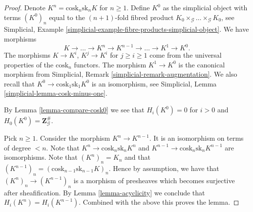 \documentclass[10pt,a4paper]{amsart}
\theoremstyle{plain}
\theoremstyle{definition}
\theoremstyle{remark}
\numberwithin{equation}{subsection}
\begin{document}
\begin{proof}
Denote $K^n = \text{cosk}_n \text{sk}_n K$ for $n \geq 1$.
Define $K^0$ as the simplicial object with terms
$(K^0)_n$ equal to the $(n + 1)$-fold fibred product
$K_0 \times_\mathcal{G} \ldots \times_\mathcal{G} K_0$,
see Simplicial,
Example \ref{simplicial-example-fibre-products-simplicial-object}.
We have morphisms
$$
K \longrightarrow \ldots \to K^n \to K^{n - 1} \to \ldots \to K^1 \to K^0.
$$
The morphisms $K \to K^i$, $K^j \to K^i$ for $j \geq i \geq 1$ come
from the universal properties of the $\text{cosk}_n$ functors.
The morphism $K^1 \to K^0$ is the canonical morphism
from
Simplicial, Remark \ref{simplicial-remark-augmentation}.
We also recall that $K^0 \to \text{cosk}_1 \text{sk}_1 K^0$
is an isomorphism, see
Simplicial, Lemma \ref{simplicial-lemma-cosk-minus-one}.

\medskip\noindent
By Lemma \ref{lemma-compare-cosk0} we see that
$H_i(K^0) = 0$ for $i > 0$ and $H_0(K^0) = \mathbf{Z}_\mathcal{G}^\#$.

\medskip\noindent
Pick $n \geq 1$. Consider the morphism $K^n \to K^{n - 1}$.
It is an isomorphism on terms of degree $< n$.
Note that $K^n \to \text{cosk}_n \text{sk}_n K^n$ and
$K^{n - 1} \to \text{cosk}_n \text{sk}_n K^{n - 1}$
are isomorphisms. Note that $(K^n)_n = K_n$ and
that $(K^{n - 1})_n = (\text{cosk}_{n - 1} \text{sk}_{n - 1} K)_n$.
Hence by assumption, we have that $(K^n)_n \to (K^{n - 1})_n$
is a morphism of presheaves which becomes surjective after
sheafification. By Lemma \ref{lemma-acyclicity} we conclude that
$H_i(K^n) = H_i(K^{n - 1})$.
Combined with the above this proves the lemma.
\end{proof}



\end{document}
